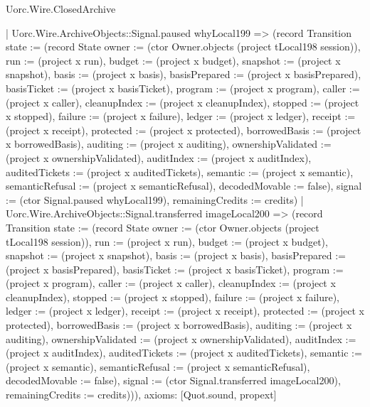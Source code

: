 \begin{lexlean}{Uorc.Wire.ClosedArchive}
\begin{semanticmodule}
{    | Uorc.Wire.ArchiveObjects::Signal.paused whyLocal199 => (record Transition {state := (record State {owner := (ctor Owner.objects (project tLocal198 session)), run := (project x run), budget := (project x budget), snapshot := (project x snapshot), basis := (project x basis), basisPrepared := (project x basisPrepared), basisTicket := (project x basisTicket), program := (project x program), caller := (project x caller), cleanupIndex := (project x cleanupIndex), stopped := (project x stopped), failure := (project x failure), ledger := (project x ledger), receipt := (project x receipt), protected := (project x protected), borrowedBasis := (project x borrowedBasis), auditing := (project x auditing), ownershipValidated := (project x ownershipValidated), auditIndex := (project x auditIndex), auditedTickets := (project x auditedTickets), semantic := (project x semantic), semanticRefusal := (project x semanticRefusal), decodedMovable := false}), signal := (ctor Signal.paused whyLocal199), remainingCredits := credits})
    | Uorc.Wire.ArchiveObjects::Signal.transferred imageLocal200 => (record Transition {state := (record State {owner := (ctor Owner.objects (project tLocal198 session)), run := (project x run), budget := (project x budget), snapshot := (project x snapshot), basis := (project x basis), basisPrepared := (project x basisPrepared), basisTicket := (project x basisTicket), program := (project x program), caller := (project x caller), cleanupIndex := (project x cleanupIndex), stopped := (project x stopped), failure := (project x failure), ledger := (project x ledger), receipt := (project x receipt), protected := (project x protected), borrowedBasis := (project x borrowedBasis), auditing := (project x auditing), ownershipValidated := (project x ownershipValidated), auditIndex := (project x auditIndex), auditedTickets := (project x auditedTickets), semantic := (project x semantic), semanticRefusal := (project x semanticRefusal), decodedMovable := false}), signal := (ctor Signal.transferred imageLocal200), remainingCredits := credits}))),
  axioms: [Quot.sound, propext]
}


\end{semanticmodule}
\end{lexlean}
